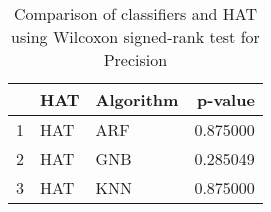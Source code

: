 \begin{table}
\footnotesize
\caption{Comparison of classifiers and HAT using Wilcoxon signed-rank test for Precision}
\label{tab:HAT wilcoxon Precision comparison}
\begin{tabular}{lllr}
\hline
 & HAT & Algorithm & p-value \\
\hline
1 & HAT & ARF & 0.875000 \\
2 & HAT & GNB & 0.285049 \\
3 & HAT & KNN & 0.875000 \\
\hline
\end{tabular}
\end{table}
